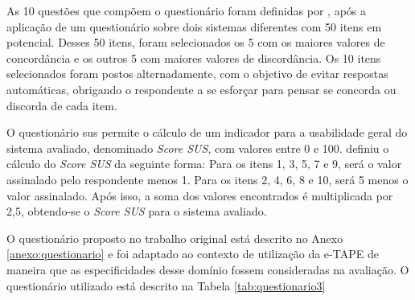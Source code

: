 \par
As 10 questões que compõem o questionário foram definidas por , após a aplicação de um questionário sobre dois sistemas diferentes com 50 itens em potencial. Desses 50 itens, foram selecionados os 5 com os maiores valores de concordância e os outros 5 com maiores valores de discordância. Os 10 itens selecionados
foram postos alternadamente, com o objetivo de evitar respostas automáticas, obrigando o respondente a se esforçar para pensar se concorda ou discorda de cada item. 

\par
O questionário \acrshort{sus} permite o cálculo de um indicador para a usabilidade geral do sistema avaliado, denominado \textit{Score SUS}, com valores entre 0 e 100. 
 definiu o cálculo do \textit{Score SUS} da seguinte forma:
Para os itens 1, 3, 5, 7 e 9, será o valor assinalado pelo respondente menos 1. Para os itens 2, 4, 6, 8 e 10, será 5 menos o valor assinalado. Após isso, a soma dos valores 
encontrados é multiplicada por 2,5, obtendo-se o \textit{Score SUS} para o sistema avaliado.

\par
O questionário proposto no trabalho original está descrito no Anexo \ref{anexo:questionario} e  foi adaptado ao contexto de utilização da e-TAPE de maneira que as especificidades desse domínio fossem consideradas na avaliação. O questionário utilizado está descrito na Tabela \ref{tab:questionario3}

